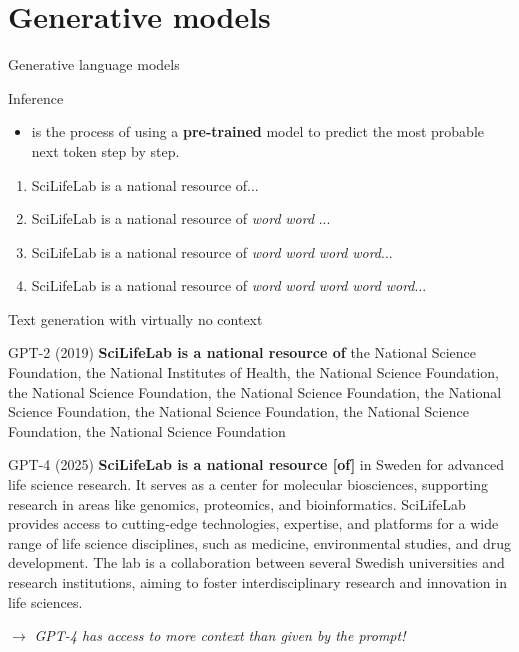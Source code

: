 \documentclass[10pt]{beamer}
\newcommand{\feature}[1]{{\color{scLime} \textbf{#1}}}
\newcommand{\remark}[1]{{\par \color{scGrape} \ensuremath{\rightarrow} \emph{#1}}}
\begin{document}

\section{Generative models}


\begin{frame}{Generative language models}
	\begin{exampleblock}{Inference}
		\begin{itemize}
			\item is the process of using a \feature{pre-trained} model to predict the most probable next token step by step.
		\end{itemize}
	\end{exampleblock}
	\begin{enumerate}
		\item SciLifeLab is a national resource of...
		\item SciLifeLab is a national resource of \emph{word} \emph{word} ...
		\item SciLifeLab is a national resource of \emph{word} \emph{word} \emph{word} \emph{word}...
		\item SciLifeLab is a national resource of \emph{word} \emph{word} \emph{word} \emph{word} \emph{word}...
	\end{enumerate}
\end{frame}

\begin{frame}{Text generation with virtually no context}
		
	\begin{alertblock}{GPT-2 (2019) }
		\small
		\textbf{SciLifeLab is a national resource of} the National Science Foundation, the National Institutes of Health, the National Science Foundation, the National Science Foundation, the National Science Foundation, the National Science Foundation, the National Science Foundation, the National Science Foundation, the National Science Foundation
	\end{alertblock}
		
	\begin{alertblock}{GPT-4 (2025)}
		\small
		\textbf{SciLifeLab is a national resource [of]} in Sweden for advanced life science research. It serves as a center for molecular biosciences, supporting research in areas like genomics, proteomics, and bioinformatics. SciLifeLab provides access to cutting-edge technologies, expertise, and platforms for a wide range of life science disciplines, such as medicine, environmental studies, and drug development. The lab is a collaboration between several Swedish universities and research institutions, aiming to foster interdisciplinary research and innovation in life sciences.
	\end{alertblock}
	\remark{GPT-4 has access to more context than given by the prompt!}
\end{frame}
\end{document}
